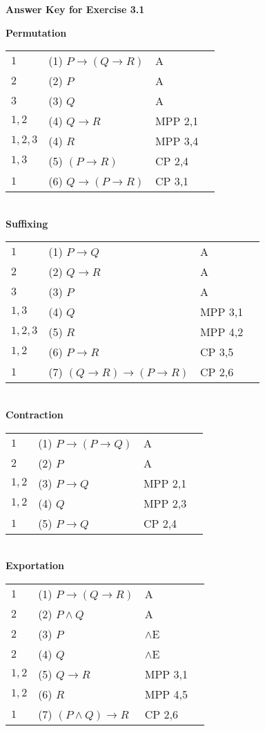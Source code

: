 \documentclass[11pt]{article}
\begin{document}
\begin{center}
\large \textbf{Answer Key for Exercise 3.1}	
\end{center}
\bigskip

\noindent \textbf{Permutation}\smallskip \\
\noindent
\begin{tabular}{l l l l}
$1$ & (1) $P \rightarrow (Q \rightarrow R)$ & A \\
$2$ & (2) $P$ & A \\
$3$ & (3) $Q$ & A \\
$1,2$ & (4) $Q \rightarrow R$ & MPP 2,1 \\
$1,2,3$ & (4) $R$ & MPP 3,4 \\
$1,3$ & (5) $(P \rightarrow R)$ & CP 2,4 \\
$1$ & (6) $Q \rightarrow (P \rightarrow R)$ & CP 3,1 \\
\end{tabular}
\bigskip\\
\noindent \textbf{Suffixing}\smallskip \\
\begin{tabular}{l l l l}
$1$ & (1) $P \rightarrow Q$ & A \\
$2$ & (2) $Q \rightarrow R$ & A \\
$3$ & (3) $P$ & A \\
$1,3$ & (4) $Q$ & MPP 3,1 \\
$1,2,3$ & (5) $R$ & MPP 4,2 \\
$1,2$ & (6) $P \rightarrow R$ & CP 3,5 \\
$1$ & (7) $(Q \rightarrow R) \rightarrow (P \rightarrow R)$ & CP 2,6 \\
\end{tabular}
\bigskip\\
\noindent \textbf{Contraction}\smallskip \\
\begin{tabular}{l l l l}
$1$ & (1) $P \rightarrow (P \rightarrow Q)$ & A \\
$2$ & (2) $P$ & A \\
$1,2$ & (3) $P \rightarrow Q$ & MPP 2,1 \\
$1,2$ & (4) $Q$ & MPP 2,3 \\
$1$ & (5) $P \rightarrow Q$ & CP 2,4\\
\end{tabular}
\bigskip\\
\noindent \textbf{Exportation}\smallskip \\
\begin{tabular}{l l l l}
$1$ & (1) $P \rightarrow (Q \rightarrow R)$ & A \\
$2$ & (2) $P \wedge Q$ & A \\
$2$ & (3) $P$ & $\wedge$E  \\
$2$ & (4) $Q$ & $\wedge$E  \\
$1,2$ & (5) $Q \rightarrow R$ & MPP 3,1 \\
$1,2$ & (6) $R$ & MPP 4,5 \\
$1$ & (7) $(P \wedge Q) \rightarrow R$ & CP 2,6 \\
\end{tabular}
\end{document}
